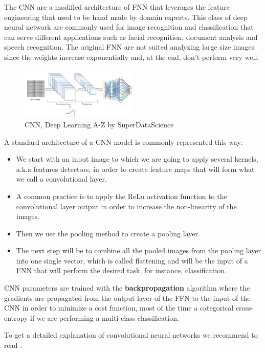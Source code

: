 \documentclass[letter,8pt]{article}\usepackage[]{graphicx}\usepackage[]{color}
\begin{document}
The CNN are a modified architecture of FNN that leverages the feature engineering that used to be hand made by domain experts. This class of deep neural network are commonly used for image recognition and classification that can serve different applications such as facial recognition, document analysis and speech recognition. The original FNN are not suited analyzing large size images since the weights increase exponentially and, at the end, don't perform very well.\\
\begin{figure}
  \begin{center}
    \includegraphics[width=0.5\textwidth]{figure/CNN_process.png}
  \end{center}
  \caption{CNN, Deep Learning A-Z by SuperDataScience}
\end{figure}
A standard architecture of a CNN model is commonly represented this way:
\begin{itemize}
\item We start with an input image to which we are going to apply several kernels, a.k.a features detectors, in order to create feature maps that will form what we call a convolutional layer. 
\item A common practice is to apply the ReLu activation function to the convolutional layer output in order to increase the non-linearity of the images.
\item Then we use the pooling method to create a pooling layer.
\item The next step will be to combine all the pooled images from the pooling layer into one single vector, which is called flattening and will be the input of a FNN that will perform the desired task, for instance, classification. 
\end{itemize}
CNN parameters are trained with the \textbf{backpropagation} algorithm where the gradients are propagated from the output layer of the FFN to the input of the CNN in order to minimize a cost function, most of the time a categorical cross-entropy if we are performing a multi-class classification. 


To get a detailed explanation of convolutional neural networks we recommend to read \cite[Chapter 9]{Goodfellow-et-al-2016}.\\
\end{document}
